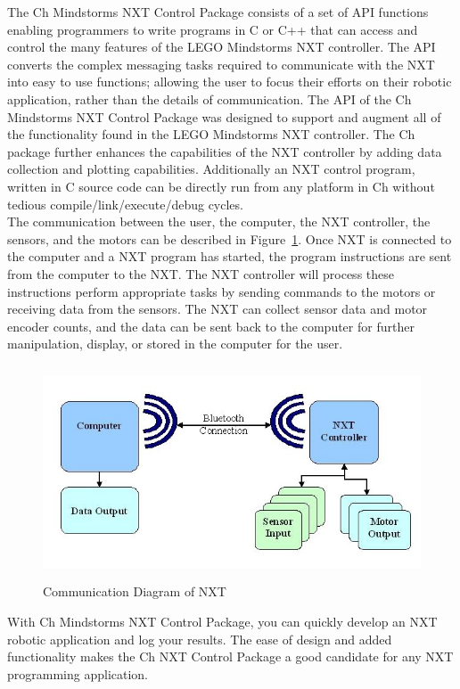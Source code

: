 \documentclass[11pt]{article}
\begin{document}
The Ch Mindstorms NXT Control Package consists of a set of API functions enabling programmers to 
write programs in C or C++ that can access and control the many features of the LEGO Mindstorms 
NXT controller. The API converts the complex messaging tasks required to communicate with the NXT 
into easy to use functions; allowing the user  to focus their efforts on their robotic application, 
rather than the details of communication. The API of the Ch Mindstorms NXT Control Package was 
designed to support and augment all of the functionality found in the LEGO Mindstorms NXT controller.
The Ch package further enhances the capabilities of the NXT controller by adding data collection and 
plotting capabilities. Additionally an NXT control program, written in C source code can be directly 
run from any platform in Ch without tedious compile/link/execute/debug cycles.\\

The communication between the user, the computer, the NXT controller, the sensors, and the motors can
be described in Figure~\ref{fig_NXT_comm}. Once NXT is connected to the computer and a NXT program 
has started, the program instructions are sent from the computer to the NXT. The NXT controller will 
process these instructions perform appropriate tasks by sending commands to the motors or receiving 
data from the sensors. The NXT can collect sensor data and motor encoder counts, and the data can be 
sent back to the computer for further manipulation, display, or stored in the computer for the user.\\
\begin{figure}[H]
  \begin{center}
    \includegraphics[height=2.5in]{figure/mindstorm/NXT_connect.png}
    \caption{Communication Diagram of NXT\label{fig_NXT_comm}}
  \end{center}
\end{figure}
With Ch Mindstorms NXT Control Package, you can quickly develop an NXT robotic application and log 
your results. The ease of design and added functionality makes the Ch NXT Control Package a good 
candidate for any NXT programming application.\\
\end{document}
